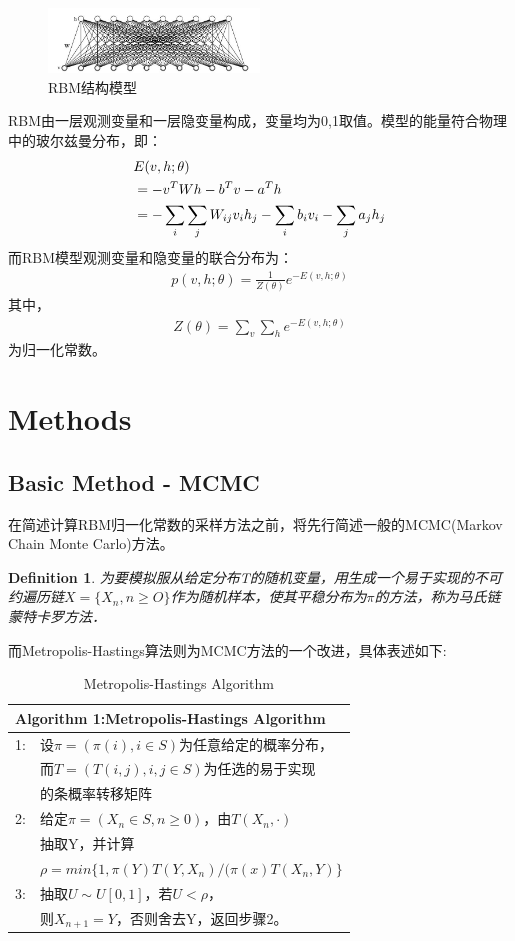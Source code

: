 \documentclass[journal,a4paper]{IEEEtran}
\newtheorem{myDef}{\textbf{Definition}}
\begin{document}
		\begin{figure}[h]
		\centering
		\includegraphics[width=0.5\textwidth]{1.jpg}
		\caption{RBM结构模型}
		\label{fig1}
		\end{figure}
	RBM由一层观测变量和一层隐变量构成，变量均为0,1取值。模型的能量符合物理中的玻尔兹曼分布，即：
		\begin{align}
		 & E(v,h;\theta) \notag \\
		 & =  -v^TWh-b^Tv-a^Th \notag \\
		 & =  -	\sum_{i}{\sum_j{ W_{ij}v_ih_j - \sum_i b_iv_i - \sum_j a_jh_j}}
		\end{align}
	而RBM模型观测变量和隐变量的联合分布为：
		\begin{align}
		p(v,h;\theta) = \frac{1}{Z(\theta)}e^{-E(v,h;\theta)}
		\end{align}
	其中，
		\begin{align}
		Z(\theta) = \sum_{v} \sum_h e^{-E(v,h;\theta)}
		\end{align}
	为归一化常数。

	\section{Methods}
	\subsection{Basic Method - MCMC}

	在简述计算RBM归一化常数的采样方法之前，将先行简述一般的MCMC(Markov Chain Monte Carlo)方法。
	\begin{myDef}
		为要模拟服从给定分布T的随机变量，用生成一个易于实现的不可约遍历链$ X=\{X_n,n\geq O\} $作为随机样本，使其平稳分布为$ \pi $的方法，称为马氏链蒙特卡罗方法．
	\end{myDef}
	而Metropolis-Hastings算法则为MCMC方法的一个改进，具体表述如下:

	\begin{table}[h]
		\begin{tabular}{ll}
			\hline
			\multicolumn{2}{l}{\textbf{Algorithm 1:}Metropolis-Hastings Algorithm} \\
			\hline
			1: & 设$\pi = (\pi(i), i\in S)$为任意给定的概率分布，\\
			 & 而$ T = (T(i,j), i,j\in S)$为任选的易于实现 \\
			 & 的条概率转移矩阵\\
			2: & 给定$\pi = (X_n\in S, n\geq 0)$，由$T(X_n,·) $ \\
			 & 抽取Y，并计算\\
			 & $ \rho = min\{ 1,\pi(Y)T(Y,X_n)/(\pi(x)T(X_n,Y) \} $ \\
			3: & 抽取$ U \sim U[0,1]$，若$ U <\rho$， \\
			 & 则$ X_{n+1} = Y$，否则舍去Y，返回步骤2。\\
			\hline
		\end{tabular}
		\caption{Metropolis-Hastings Algorithm}
		\label{tab1}
	\end{table}
\end{document}
